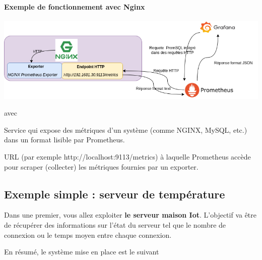 \documentclass[french, 12pt]{article}%
\newcommand{\titreencadre}{Titre}
\newenvironment{encadre}[1]{\renewcommand{\titreencadre}{#1}
	\begin{mdframed}[style=encadrestyle]
	\vspace{0.5\baselineskip}
	}{%
	\end{mdframed}}
\begin{document}
\paragraph{Exemple de fonctionnement avec Nginx }

\begin{center}
\includegraphics[scale=0.5]{./ressource/schemaPrometheus.drawio.png}
\end{center}
avec 

\begin{encadre}{Exporter}
Service qui expose des métriques d’un système (comme NGINX, MySQL, etc.) dans un format lisible par Prometheus.
\end{encadre}

\begin{encadre}{Endpoint}
URL (par exemple http://localhost:9113/metrics) à laquelle Prometheus accède pour scraper (collecter) les métriques fournies par un exporter.
\end{encadre}


\subsection{Exemple simple : serveur de température}

Dans une premier, vous allez exploiter \textbf{le serveur maison Iot}. L'objectif va être de récupérer des informations sur l'état du serveur tel que le nombre de connexion ou le temps moyen entre chaque connexion.  

En résumé, le système mise en place est le suivant
\end{document}
